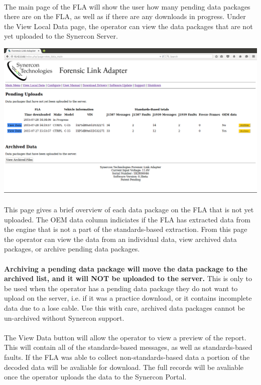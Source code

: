 \documentclass[11pt, oneside]{book}
\begin{document}
\paragraph{}
The main page of the FLA will show the user how many pending data packages there are on the FLA, as well as if there are any downloads in progress. Under the View Local Data page, the operator can view the data packages that are not yet uploaded to the Synercon Server.
\begin{center}
\includegraphics[width=1\linewidth]{../media/fla_preview_screenshots/local_data}
\end{center}
\paragraph{  }
This page gives a brief overview of each data package on the FLA that is not yet uploaded. The OEM data column indiciates if the FLA has extracted data from the engine that is not a part of the standards-based extraction. From this page the operator can view the data from an individual data, view archived data packages, or archive pending data packages.
\paragraph{  }
\textbf{Archiving a pending data package will move the data package to the archived list, and it will NOT be uploaded to the server.}
This is only to be used when the operator has a pending data package they do not want to upload on the server, i.e. if it was a practice download, or it contains incomplete data due to a lose cable. Use this with care, archived data packages cannot be un-archived without Synercon support.
\paragraph{  }
The View Data button will allow the operator to view a preview of the report. This will contain all of the standards-based messages, as well as standards-based faults. If the FLA was able to collect non-standards-based data a portion of the decoded data will be avaliable for download. The full records will be avaliable once the operator uploads the data to the Synercon Portal.
\end{document}
